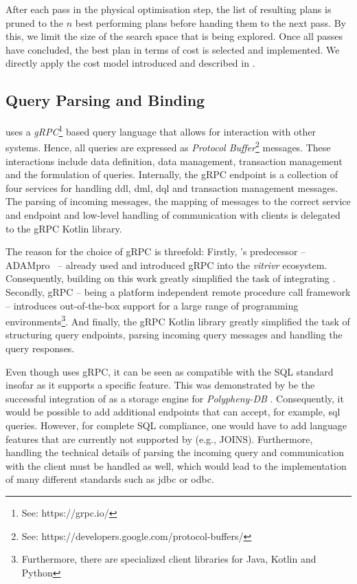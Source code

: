 After each pass in the physical optimisation step, the list of resulting plans is pruned to the $n$ best performing plans before handing them to the next pass. By this, we limit the size of the search space that is being explored. Once all passes have concluded, the best plan in terms of cost is selected and implemented. We directly apply the cost model introduced and described in .

\subsection{Query Parsing and Binding}
\cottontail{} uses a \emph{gRPC}\footnote{See: https://grpc.io/} based query language that allows for interaction with other systems. Hence, all queries are expressed as \emph{Protocol Buffer}\footnote{See: https://developers.google.com/protocol-buffers/} messages. These interactions include data definition, data management, transaction management and the formulation of queries. Internally, the gRPC endpoint is a collection of four services for handling \acrshort{ddl}, \acrshort{dml}, \acrshort{dql} and transaction management messages. The parsing of incoming messages, the mapping of messages to the correct service and endpoint and low-level handling of communication with clients is delegated to the gRPC Kotlin library. 

The reason for the choice of gRPC is threefold: Firstly, \cottontail{}'s predecessor -- ADAMpro~\cite{Giangreco:2016Adam} -- already used and introduced gRPC into the \emph{vitrivr} ecosystem. Consequently, building on this work greatly simplified the task of integrating \cottontail{}. Secondly, gRPC -- being a platform independent remote procedure call framework -- introduces out-of-the-box support for a large range of programming environments\footnote{Furthermore, there are specialized client libraries for Java, Kotlin and Python}. And finally, the gRPC Kotlin library greatly simplified the task of structuring query endpoints, parsing incoming query messages and handling the query responses.

Even though \cottontail{} uses gRPC, it can be seen as compatible with the SQL standard insofar as it supports a specific feature. This was demonstrated by be the successful integration of \cottontail{} as a storage engine for \emph{Polypheny-DB} \cite{Vogt:2018Polypheny,Vogt:2020Polypheny}. Consequently, it would be possible to add additional endpoints that can accept, for example, \acrshort{sql} queries. However, for complete SQL compliance, one would have to add language features that are currently not supported by \cottontail{} (e.g., JOINS). Furthermore, handling the technical details of parsing the incoming query and communication with the client must be handled as well, which would lead to the implementation of many different standards such as \acrshort{jdbc} or \acrshort{odbc}.

